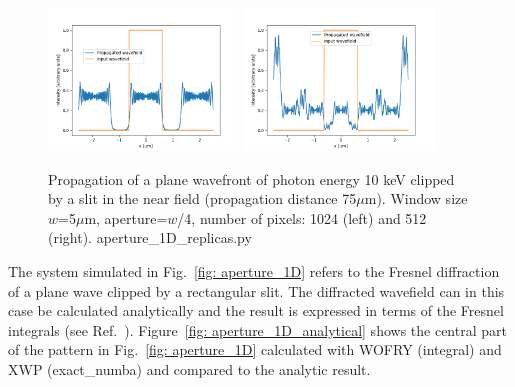 \documentclass{iucr}              %
\newcommand{\ingreen}[1]{{\color{green}#1}}
\begin{document}
\begin{figure}
\label{fig: aperture_1D_replica}
\caption{Propagation of a plane wavefront of photon energy 10 keV clipped by a slit in the near field (propagation distance 75$\mu$m). Window size $w$=5$\mu$m, aperture=$w$/4, number of pixels: 1024 (left) and 512 (right). \ingreen{aperture\_1D\_replicas.py}
}
\includegraphics[width=0.45\textwidth]{aperture_1D_over2.png}
\includegraphics[width=0.45\textwidth]{aperture_1D_over4.png}
\end{figure}


The system simulated in Fig.~\ref{fig: aperture_1D} refers to  the Fresnel diffraction of a plane wave clipped by a rectangular slit. The diffracted wavefield can in this case be calculated analytically and the result is expressed in terms of the Fresnel integrals (see Ref.~\cite{goodmanfourier}).  Figure~\ref{fig: aperture_1D_analytical} shows the central part of the pattern in Fig.~\ref{fig: aperture_1D} calculated with WOFRY (integral) and XWP (exact\_numba) and compared to the analytic result. 
\end{document}
